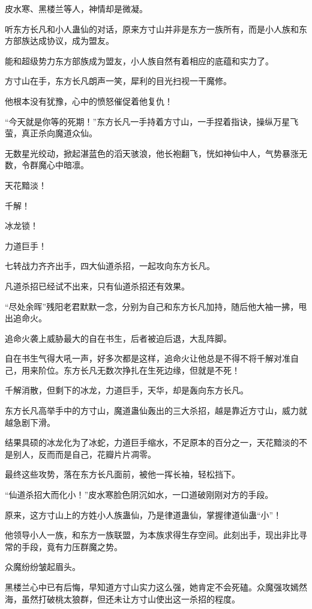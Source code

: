 \begin{this_body}
皮水寒、黑楼兰等人，神情却是微凝。

听东方长凡和小人蛊仙的对话，原来方寸山并非是东方一族所有，而是小人族和东方部族达成协议，成为盟友。

能和超级势力东方部族成为盟友，小人族自然有着相应的底蕴和实力了。

方寸山在手，东方长凡朗声一笑，犀利的目光扫视一干魔修。

他根本没有犹豫，心中的愤怒催促着他复仇！

“今天就是你等的死期！”东方长凡一手持着方寸山，一手捏着指诀，操纵万星飞萤，真正杀向魔道众仙。

无数星光绞动，掀起湛蓝色的滔天骇浪，他长袍翻飞，恍如神仙中人，气势暴涨无数，令群魔心中暗凛。

天花黯淡！

千解！

冰龙锁！

力道巨手！

七转战力齐齐出手，四大仙道杀招，一起攻向东方长凡。

凡道杀招已经试不出来，只有仙道杀招还有效果。

“尽处余晖”残阳老君默默一念，分别为自己和东方长凡加持，随后他大袖一拂，甩出追命火。

追命火袭上威胁最大的自在书生，后者被迫后退，大乱阵脚。

自在书生气得大吼一声，好多次都是这样，追命火让他总是不得不将千解对准自己，用来阶位。东方长凡无数次挣扎在生死边缘，但就是不死！

千解消散，但剩下的冰龙，力道巨手，天华，却是轰向东方长凡。

东方长凡高举手中的方寸山，魔道蛊仙轰出的三大杀招，越是靠近方寸山，威力就越急剧下滑。

结果具硕的冰龙化为了冰蛇，力道巨手缩水，不足原本的百分之一，天花黯淡的不是别人，反而而是自己，花瓣片片凋零。

最终这些攻势，落在东方长凡面前，被他一挥长袖，轻松挡下。

“仙道杀招大而化小！”皮水寒脸色阴沉如水，一口道破刚刚对方的手段。

原来，这方寸山上的方姓小人族蛊仙，乃是律道蛊仙，掌握律道仙蛊“小”！

他领导小人一族，和东方一族联盟，为本族求得生存空间。此刻出手，现出非比寻常的手段，竟有力压群魔之势。

众魔纷纷皱起眉头。

黑楼兰心中已有后悔，早知道方寸山实力这么强，她肯定不会死磕。众魔强攻嫣然海，虽然打破桃太狼群，但还未让方寸山使出这一杀招的程度。


\end{this_body}
